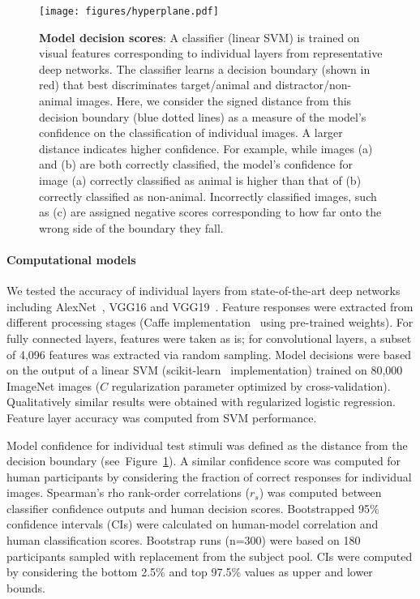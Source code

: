 \documentclass{article}
\begin{document}
\begin{figure}[t!]
  \begin{center}
    \texttt{[image: figures/hyperplane.pdf]}
    \caption[Model Confidence Metric]{\textbf{Model decision scores}: A classifier (linear SVM) is trained on visual features corresponding to individual layers  from representative deep networks. The classifier learns a decision boundary (shown in red) that best discriminates target/animal and distractor/non-animal images. Here, we consider the signed distance from this decision boundary (blue dotted lines) as a measure of the model's confidence on the classification of individual images. A larger distance indicates higher confidence. For example, while images (a) and (b) are both correctly classified, the model's confidence for image (a) correctly classified as animal is higher than that of (b) correctly classified as non-animal. Incorrectly classified images, such as (c) are assigned negative scores corresponding to how far onto the wrong side of the boundary they fall.
    \label{fig:methods:hyper}}
  \end{center}
\end{figure}



\paragraph{Computational models}

We tested the accuracy of individual layers from state-of-the-art deep networks including AlexNet~\citep{Krizhevsky2012}, VGG16 and VGG19~\citep{Simonyan2014a}. Feature responses were extracted from different processing stages (Caffe implementation~\citep{jia2014} using pre-trained weights). For fully connected layers, features were taken as is; for  convolutional layers, a subset of 4,096 features was extracted via random sampling. Model decisions were based on the output of a linear SVM (scikit-learn~\citep{sklearn} implementation) trained on 80,000 ImageNet images ($C$ regularization parameter optimized by cross-validation). Qualitatively similar results were obtained with regularized logistic regression. Feature layer accuracy was computed from SVM performance. 

Model confidence for individual test stimuli was defined as the distance from the decision boundary (see~Figure~\ref{fig:methods:hyper}). A similar confidence score was computed for human participants by considering the fraction of correct responses for individual images. Spearman's rho rank-order correlations ($r_s$) was computed between classifier confidence outputs and human decision scores. Bootstrapped 95\% confidence intervals (CIs) were calculated on human-model correlation and human classification scores. Bootstrap runs (n=300) were based on 180 participants sampled with replacement from the subject pool. CIs were computed by considering the bottom 2.5\% and top 97.5\% values as upper and lower bounds.
\end{document}

